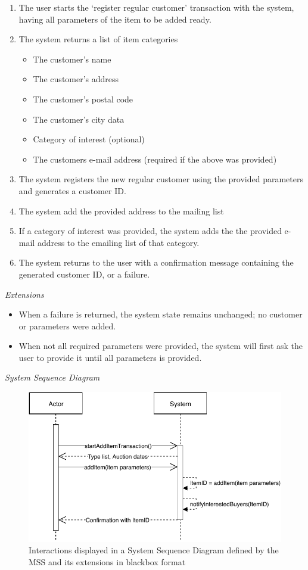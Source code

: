 \begin{enumerate}[noitemsep]
	\item The user starts the `register regular customer' transaction with the system, having all parameters of the item to be added ready.
	\item The system returns a list of item categories
	\begin{itemize}[noitemsep]
		\item The customer's name
		\item The customer's address
		\item The customer's postal code
		\item The customer's city data
		\item Category of interest (optional)
		\item The customers e-mail address (required if the above was provided)
	\end{itemize}
	\item The system registers the new regular customer using the provided parameters and generates a customer ID.
	\item The system add the provided address to the mailing list
	\item If a category of interest was provided, the system adds the the provided e-mail address to the emailing list of that category.
	\item The system returns to the user with a confirmation message containing the generated customer ID, or a failure. 
\end{enumerate}
\textsl{Extensions}
\begin{itemize}[noitemsep]
	\item When a failure is returned, the system state remains unchanged; no customer or parameters were added.
	\item When not all required parameters were provided, the system will first ask the user to provide it until all parameters is provided.
\end{itemize}
\textsl{System Sequence Diagram}
\begin{figure}[H]
	\centering
	\includegraphics[scale=1]{uml/SD-bb-create.pdf}
	\caption*{Interactions displayed in a System Sequence Diagram defined by the MSS and its extensions in blackbox format}
\end{figure}